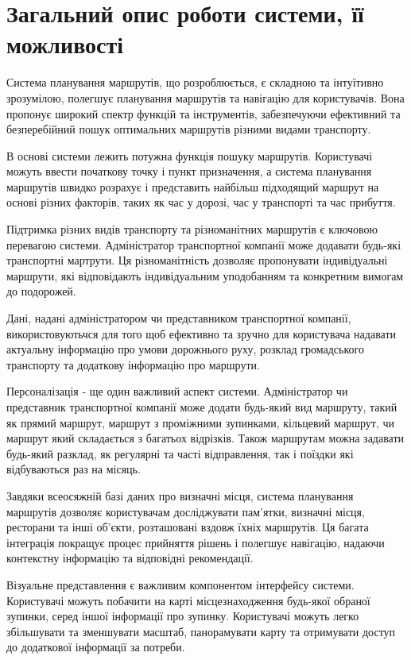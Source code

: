 \section{Загальний опис роботи системи, її можливості}
\label{sec:functionality}

Система планування маршрутів, що розроблюється, є складною та інтуїтивно зрозумілою, полегшує планування маршрутів та навігацію для користувачів. Вона пропонує широкий спектр функцій та інструментів, забезпечуючи ефективний та безперебійний пошук оптимальних маршрутів різними видами транспорту.

В основі системи лежить потужна функція пошуку маршрутів. Користувачі можуть ввести початкову точку і пункт призначення, а система планування маршрутів швидко розрахує і представить найбільш підходящий маршрут на основі різних факторів, таких як час у дорозі, час у транспорті та час прибуття.

Підтримка різних видів транспорту та різноманітних маршрутів є ключовою перевагою системи. Адміністратор транспортної компанії може додавати будь-які транспортні мартрути. Ця різноманітність дозволяє пропонувати індивідуальні маршрути, які відповідають індивідуальним уподобанням та конкретним вимогам до подорожей.

Дані, надані адміністратором чи представником транспортної компанії, використовуютьчся для того щоб ефективно та зручно для користувача надавати актуальну інформацію про умови дорожнього руху, розклад громадського транспорту та додаткову інформацію про маршрути.

Персоналізація - ще один важливий аспект системи. Адміністратор чи представник транспортної компанії може додати будь-який вид маршруту, такий як прямий маршрут, маршрут з проміжними зупинками, кільцевий маршрут, чи маршрут який складається з багатьох відрізків. Також маршрутам можна задавати будь-який разклад, як регулярні та часті відправлення, так і поїздки які відбуваються раз на місяць.


Завдяки всеосяжній базі даних про визначні місця, система планування маршрутів дозволяє користувачам досліджувати пам'ятки, визначні місця, ресторани та інші об'єкти, розташовані вздовж їхніх маршрутів. Ця багата інтеграція покращує процес прийняття рішень і полегшує навігацію, надаючи контекстну інформацію та відповідні рекомендації.

Візуальне представлення є важливим компонентом інтерфейсу системи. Користувачі можуть побачити на карті місцезнаходження будь-якої обраної зупинки, серед іншої інформації про зупинку. Користувачі можуть легко збільшувати та зменшувати масштаб, панорамувати карту та отримувати доступ до додаткової інформації за потреби.

